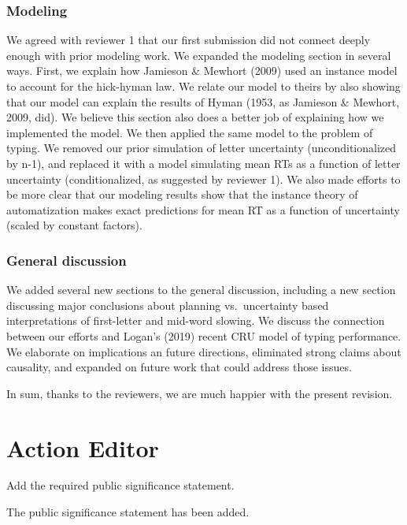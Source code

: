 \documentclass[draft]{article}
\begin{document}
\hypertarget{modeling}{%
\subsubsection{Modeling}\label{modeling}}

We agreed with reviewer 1 that our first submission did not connect deeply enough with prior modeling work. We expanded the modeling section in several ways. First, we explain how Jamieson \& Mewhort (2009) used an instance model to account for the hick-hyman law. We relate our model to theirs by also showing that our model can explain the results of Hyman (1953, as Jamieson \& Mewhort, 2009, did). We believe this section also does a better job of explaining how we implemented the model. We then applied the same model to the problem of typing. We removed our prior simulation of letter uncertainty (unconditionalized by n-1), and replaced it with a model simulating mean RTs as a function of letter uncertainty (conditionalized, as suggested by reviewer 1). We also made efforts to be more clear that our modeling results show that the instance theory of automatization makes exact predictions for mean RT as a function of uncertainty (scaled by constant factors).

\hypertarget{general-discussion}{%
\subsubsection{General discussion}\label{general-discussion}}

We added several new sections to the general discussion, including a new section discussing major conclusions about planning vs.~uncertainty based interpretations of first-letter and mid-word slowing. We discuss the connection between our efforts and Logan's (2019) recent CRU model of typing performance. We elaborate on implications an future directions, eliminated strong claims about causality, and expanded on future work that could address those issues.

In sum, thanks to the reviewers, we are much happier with the present revision.

\hypertarget{action-editor}{%
\section{Action Editor}\label{action-editor}}

\RC Add the required public significance statement.

The public significance statement has been added.
\end{document}
